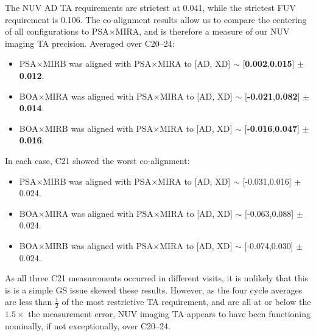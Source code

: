 The NUV AD TA requirements are strictest at 0.041\arcsec, while the strictest FUV requirement is 0.106\arcsec.
The co-alignment results allow us to compare the centering of all  configurations to PSA$\times$MIRA,
and is therefore a measure of our NUV imaging TA precision. Averaged over C20--24:
\footnotesize
\begin{itemize}
\item PSA$\times$MIRB was aligned with PSA$\times$MIRA to [AD, XD] $\sim$ [{\bf 0.002},{\bf 0.015}] $\pm$ {\bf 0.012}\arcsec.
\item BOA$\times$MIRA was aligned with PSA$\times$MIRA to [AD, XD] $\sim$ [{\bf-0.021},{\bf 0.082}] $\pm$ {\bf 0.014}\arcsec.
\item BOA$\times$MIRB was aligned with PSA$\times$MIRA to [AD, XD] $\sim$ [{\bf-0.016},{\bf 0.047}] $\pm$ {\bf 0.016}\arcsec.
\end{itemize}
\normalsize
In each case, C21 showed the worst co-alignment:
\footnotesize
\begin{itemize}
\item PSA$\times$MIRB was aligned with PSA$\times$MIRA to [AD, XD] $\sim$ [-0.031,0.016] $\pm$ 0.024\arcsec.
\item BOA$\times$MIRA was aligned with PSA$\times$MIRA to [AD, XD] $\sim$ [-0.063,0.088] $\pm$ 0.024\arcsec.
\item BOA$\times$MIRB was aligned with PSA$\times$MIRA to [AD, XD] $\sim$ [-0.074,0.030] $\pm$ 0.024\arcsec.
\end{itemize}
\normalsize
As all three C21 measurements occurred in different visits, it is unlikely that this is is a simple GS issue skewed
these results. However, as the four cycle averages are less than $\frac{1}{2}$ of the most restrictive TA requirement, and are
all at or below the $1.5\times$ the measurement error, NUV imaging TA appears to have been functioning nominally,
if not exceptionally, over C20--24.


